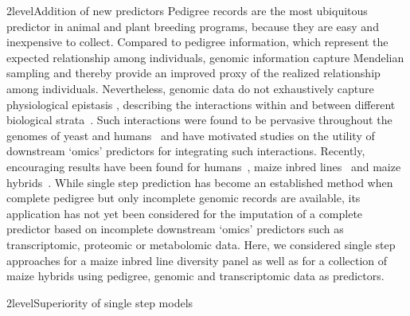 \documentclass[12pt,titlepage]{article}
\begin{document}
\Genetics2level{Addition of new predictors}
Pedigree records are the most ubiquitous predictor in animal and plant breeding
programs, because they are easy and inexpensive to collect.
Compared to pedigree information, which represent the expected relationship
among individuals, genomic information capture Mendelian sampling and thereby 
provide an improved proxy of the realized relationship among individuals.
Nevertheless, genomic data do not exhaustively capture physiological epistasis 
\cite{Jiang2015,Guo2016,Vazquez2016}, describing the interactions 
within and between different biological strata~\cite{Sackton2016}.
Such interactions were found to be pervasive throughout the genomes of yeast 
\cite{Brem2005} and humans~\cite{Brown2014} and have motivated studies on the 
utility of downstream `omics' predictors for integrating such interactions.
Recently, encouraging results have been found for humans~\cite{Vazquez2016}, 
maize inbred lines~\cite{Guo2016} and maize hybrids~\cite{Westhues2017}.
While single step prediction has become an established method when complete
pedigree but only incomplete genomic records are available, its application has
not yet been considered for the imputation of a complete predictor based on 
incomplete downstream `omics' predictors such as transcriptomic, proteomic or 
metabolomic data.
Here, we considered single step approaches for a maize inbred line diversity
panel as well as for a collection of maize hybrids using pedigree, genomic and
transcriptomic data as predictors.


\Genetics2level{Superiority of single step models}
\end{document}
